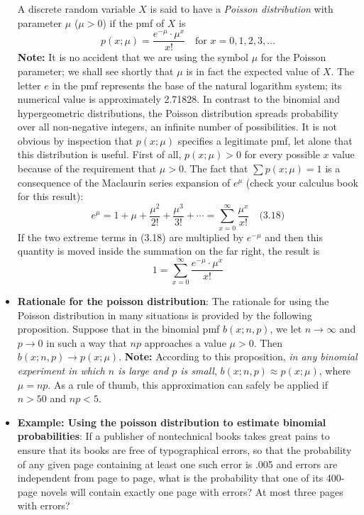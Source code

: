 \documentclass{report}
\begin{document}
\begin{itemize}
        A discrete random variable \( X \) is said to have a \textit{Poisson distribution} with parameter \( \mu \) (\( \mu > 0 \)) if the pmf of \( X \) is
        \[
        p(x; \mu) = \frac{e^{-\mu} \cdot \mu^x}{x!} \quad \text{for } x = 0, 1, 2, 3, \ldots
        \]
        \bigbreak \noindent 
        \textbf{Note:} 
        It is no accident that we are using the symbol \( \mu \) for the Poisson parameter; we shall see shortly that \( \mu \) is in fact the expected value of \( X \). The letter \( e \) in the pmf represents the base of the natural logarithm system; its numerical value is approximately 2.71828. In contrast to the binomial and hypergeometric distributions, the Poisson distribution spreads probability over all non-negative integers, an infinite number of possibilities.
        \bigbreak \noindent 
        It is not obvious by inspection that \( p(x; \mu) \) specifies a legitimate pmf, let alone that this distribution is useful. First of all, \( p(x; \mu) > 0 \) for every possible \( x \) value because of the requirement that \( \mu > 0 \). The fact that \( \sum p(x; \mu) = 1 \) is a consequence of the Maclaurin series expansion of \( e^\mu \) (check your calculus book for this result):
        \[
            e^\mu = 1 + \mu + \frac{\mu^2}{2!} + \frac{\mu^3}{3!} + \cdots = \sum_{x=0}^{\infty} \frac{\mu^x}{x!} \quad \text{(3.18)}
        \]
        If the two extreme terms in (3.18) are multiplied by \( e^{-\mu} \) and then this quantity is moved inside the summation on the far right, the result is
        \[
            1 = \sum_{x=0}^{\infty} \frac{e^{-\mu} \cdot \mu^x}{x!}
        \]
    \item \textbf{Rationale for the poisson distribution}:
        The rationale for using the Poisson distribution in many situations is provided by the following proposition.
        \bigbreak \noindent 
        Suppose that in the binomial pmf \( b(x; n, p) \), we let \( n \to \infty \) and \( p \to 0 \) in such a way that \( np \) approaches a value \( \mu > 0 \). Then \( b(x; n, p) \to p(x; \mu) \).
        \bigbreak \noindent 
        \textbf{Note:} According to this proposition, \textit{in any binomial experiment in which \( n \) is large and \( p \) is small}, \( b(x; n, p) \approx p(x; \mu) \), where \( \mu = np \). As a rule of thumb, this approximation can safely be applied if \( n > 50 \) and \( np < 5 \).
    \item \textbf{Example: Using the poisson distribution to estimate binomial probabilities}:
        \bigbreak \noindent 
        If a publisher of nontechnical books takes great pains to ensure that its books are free of typographical errors, so that the probability of any given page containing at least one such error is .005 and errors are independent from page to page, what is the probability that one of its 400-page novels will contain exactly one page with errors? At most three pages with errors?

\end{itemize}
\end{document}
